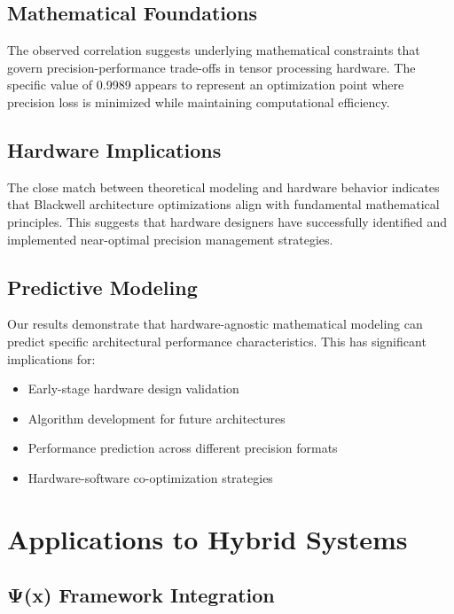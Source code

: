 \documentclass[conference]{IEEEtran}
\begin{document}
\subsection{Mathematical Foundations}

The observed correlation suggests underlying mathematical constraints that govern precision-performance trade-offs in tensor processing hardware. The specific value of 0.9989 appears to represent an optimization point where precision loss is minimized while maintaining computational efficiency.

\subsection{Hardware Implications}

The close match between theoretical modeling and hardware behavior indicates that Blackwell architecture optimizations align with fundamental mathematical principles. This suggests that hardware designers have successfully identified and implemented near-optimal precision management strategies.

\subsection{Predictive Modeling}

Our results demonstrate that hardware-agnostic mathematical modeling can predict specific architectural performance characteristics. This has significant implications for:

\begin{itemize}
\item Early-stage hardware design validation
\item Algorithm development for future architectures
\item Performance prediction across different precision formats
\item Hardware-software co-optimization strategies
\end{itemize}

\section{Applications to Hybrid Systems}

\subsection{Ψ(x) Framework Integration}
\end{document}
